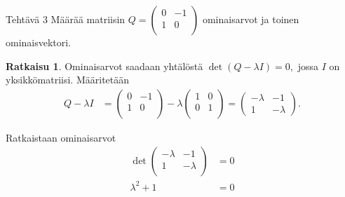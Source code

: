 \documentclass[12pt, a4paper, t]{beamer}
\theoremstyle{exercise}
\theoremstyle{remark}
\theoremstyle{definition}
\newtheorem*{rat}{Ratkaisu}
\begin{document}
\begin{frame}{Tehtävä 3}
\vspace{12pt}
Määrää matriisin $\displaystyle Q=\begin{pmatrix}
0 & -1\\
1&0\\
\end{pmatrix}$ ominaisarvot ja toinen ominaisvektori.
\vspace{100pt}
\pause
\begin{rat}
Ominaisarvot saadaan yhtälöstä $\det(Q-\lambda I)=0,$ jossa $I$ on yksikkömatriisi. Määritetään
\begin{align*}
Q-\lambda I&=\begin{pmatrix}
0 & -1\\
1&0\\
\end{pmatrix}-\lambda\begin{pmatrix}
1 & 0\\
0&1\\
\end{pmatrix}
=\begin{pmatrix}
-\lambda & -1\\
1 & -\lambda
\end{pmatrix}.
\end{align*}

Ratkaistaan ominaisarvot
\begin{align*}
\det\begin{pmatrix}
-\lambda & -1\\
1 & -\lambda\\
\end{pmatrix}  &=0\\
\lambda^2+1&=0
\end{align*}
\end{rat}

\end{frame}
\end{document}
